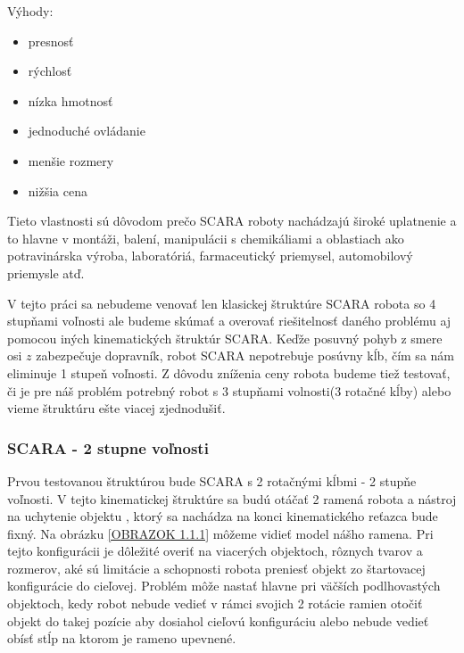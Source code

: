 Výhody:
\begin{itemize}
	\item   presnosť
	\item 	rýchlosť
	\item 	nízka hmotnosť
	\item   jednoduché ovládanie
	\item	menšie rozmery
	\item 	nižšia cena 
\end{itemize}

Tieto vlastnosti sú dôvodom prečo SCARA roboty nachádzajú široké uplatnenie a to hlavne v  montáži, balení, manipulácii s chemikáliami a oblastiach ako potravinárska výroba, laboratóriá, farmaceutický priemysel, automobilový priemysle atď.  

V tejto práci sa nebudeme venovať len klasickej štruktúre SCARA robota so 4 stupňami voľnosti ale budeme skúmať a overovať riešitelnosť daného problému aj pomocou iných kinematických štruktúr SCARA. Keďže posuvný pohyb z smere osi $z$ zabezpečuje dopravník, robot SCARA nepotrebuje posúvny kĺb, čím sa nám eliminuje 1 stupeň voľnosti. 
Z dôvodu zníženia ceny robota budeme tiež testovať, či je pre náš problém potrebný robot s 3 stupňami volnosti(3 rotačné kĺby) alebo vieme štruktúru ešte viacej zjednodušiť.   


\subsubsection{SCARA - 2 stupne voľnosti}
\label{kap:1.1.1}

Prvou testovanou štruktúrou bude SCARA s 2 rotačnými kĺbmi - 2 stupňe voľnosti. V tejto kinematickej štruktúre sa budú otáčať 2 ramená robota a nástroj na uchytenie objektu , ktorý sa nachádza na konci kinematického reťazca bude fixný.
Na obrázku \ref{OBRAZOK 1.1.1} môžeme vidieť model nášho ramena. Pri tejto konfigurácii je dôležité overiť na viacerých objektoch, rôznych tvarov a rozmerov, aké sú limitácie a schopnosti robota preniesť objekt zo štartovacej konfigurácie do cieľovej. Problém môže nastať hlavne pri väčších podlhovastých objektoch, kedy robot nebude vedieť v rámci svojich 2 rotácie ramien otočiť objekt do takej pozície aby dosiahol cieľovú konfiguráciu alebo nebude vedieť obísť stĺp na ktorom je rameno upevnené.  


